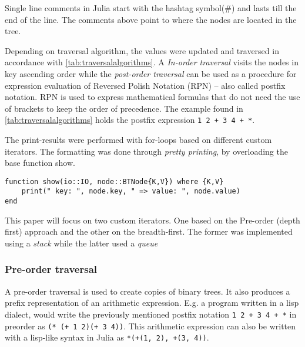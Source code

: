 \documentclass[a4paper, 11pt]{article}
\begin{document}
    Single line comments in Julia start with the hashtag symbol(\#) and lasts
    till the end of the line. 
    The comments above point to where the nodes are located in the tree. 

    Depending on traversal algorithm, the values were updated and traversed in accordance 
    with \autoref{tab:traversalalgorithms}.
    A \emph{In-order traversal} visits the nodes in key ascending order while the
    \emph{post-order traversal} can be used as a procedure for 
    expression evaluation of Reversed Polish Notation (RPN) -- also called
    postfix notation. RPN is used to express mathematical formulas 
    that do not need the use of 
    brackets to keep the order of precedence. 
    The example found in \autoref{tab:traversalalgorithms} holds the postfix
    expression \texttt{1 2 + 3 4 + *}.

    The print-results were performed with for-loops based on 
    different custom iterators. 
    The formatting was done through \emph{pretty printing}, by overloading the base function show.
    \begin{verbatim}
function show(io::IO, node::BTNode{K,V}) where {K,V}
    print(" key: ", node.key, " => value: ", node.value)
end
    \end{verbatim}
    This paper will focus on two custom iterators. 
    One based on the Pre-order (depth first) approach
    and the other on the breadth-first. 
    The former was implemented using a \emph{stack} while the latter
    used a \emph{queue}

    \subsubsection*{Pre-order traversal}
    A pre-order traversal is used to create copies of binary trees. 
    It also produces a prefix representation of an arithmetic expression. 
    E.g. a program written in a lisp dialect, would write the previously 
    mentioned postfix notation \texttt{1 2 + 3 4 + *} in preorder
    as \texttt{(* (+ 1 2)(+ 3 4))}. 
    This arithmetic expression can also be written with a lisp-like syntax in
    Julia as \texttt{*(+(1, 2), +(3, 4))}.
\end{document}

